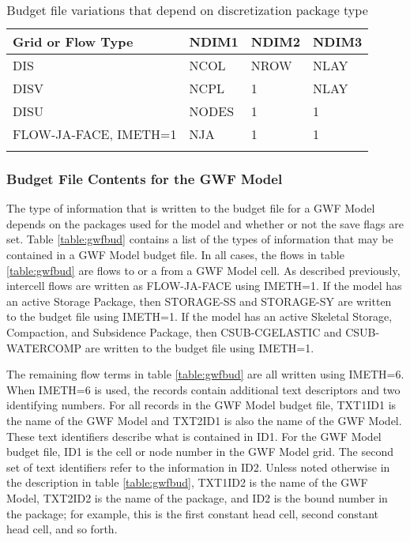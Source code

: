 \begin{longtable}{p{3cm} p{3cm} p{3cm} p{3cm}}
\caption{Budget file variations that depend on discretization package type} 
\tabularnewline
\hline
\textbf{Grid or Flow Type} & \textbf{NDIM1} & \textbf{NDIM2} & \textbf{NDIM3} \\
\hline
\endhead
\hline
\endfoot
DIS & NCOL & NROW & NLAY \\
DISV & NCPL & 1 & NLAY \\
DISU & NODES & 1 & 1 \\
FLOW-JA-FACE, IMETH=1 & NJA & 1 & 1 \\
\label{table:ndim}
\end{longtable}

\newpage
\subsubsection{Budget File Contents for the GWF Model}

The type of information that is written to the budget file for a GWF Model depends on the packages used for the model and whether or not the save flags are set.  Table \ref{table:gwfbud} contains a list of the types of information that may be contained in a GWF Model budget file.  In all cases, the flows in table \ref{table:gwfbud} are flows to or a from a GWF Model cell.  As described previously, intercell flows are written as FLOW-JA-FACE using IMETH=1.  If the model has an active Storage Package, then STORAGE-SS and STORAGE-SY are written to the budget file using IMETH=1. If the model has an active Skeletal Storage, Compaction, and Subsidence Package, then CSUB-CGELASTIC and CSUB-WATERCOMP are written to the budget file using IMETH=1.

The remaining flow terms in table \ref{table:gwfbud} are all written using IMETH=6.  When IMETH=6 is used, the records contain additional text descriptors and two identifying numbers.  For all records in the GWF Model budget file, TXT1ID1 is the name of the GWF Model and TXT2ID1 is also the name of the GWF Model.  These text identifiers describe what is contained in ID1.  For the GWF Model budget file, ID1 is the cell or node number in the GWF Model grid.  The second set of text identifiers refer to the information in ID2.  Unless noted otherwise in the description in table \ref{table:gwfbud}, TXT1ID2 is the name of the GWF Model, TXT2ID2 is the name of the package, and ID2 is the bound number in the package; for example, this is the first constant head cell, second constant head cell, and so forth.  

